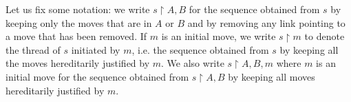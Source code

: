 \begin{rem}
%
%
%
%

\end{rem}

Let us fix some notation: we write $s\upharpoonright A,B$ for the
sequence obtained from $s$ by keeping only the moves that are in $A$ or $B$ and by removing any link pointing to a move that
has been removed.
If $m$ is an initial move, we write $s \upharpoonright m$ to
denote the thread of $s$ initiated by $m$, i.e. the sequence obtained from $s$ by keeping all the moves
hereditarily justified by $m$.
We also write $s \upharpoonright A,B,m$ where $m$ is an initial move
for the sequence obtained from $s \upharpoonright A,B$ by keeping
all moves hereditarily justified by $m$.



